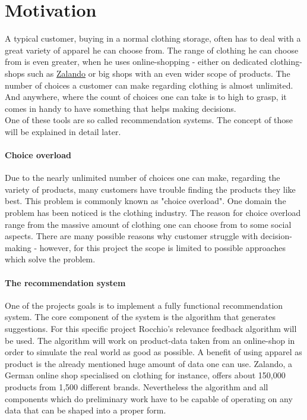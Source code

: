 

\section{Motivation}
A typical customer, buying in a normal clothing storage, often has to deal with a great variety of apparel he can choose from.
The range of clothing he can choose from is even greater, when he uses online-shopping - either on dedicated clothing-shops such as \href{https:\\www.zalando.de}{Zalando} or big shops with an even wider scope of products.
The number of choices a customer can make regarding clothing is almost unlimited.
And anywhere, where the count of choices one can take is to high to grasp, it comes in handy to have something that helps making decisions.\\
One of these tools are so called recommendation systems. The concept of those will be explained in detail later.


\paragraph{Choice overload}
Due to the nearly unlimited number of choices one can make, regarding the variety of products, many customers have trouble finding the products they like best.
This problem is commonly known as "choice overload".\citep[p. 454]{stanton:12}
One domain the problem has been noticed is the clothing industry.
The reason for choice overload range from the massive amount of clothing one can choose from to some social aspects.
There are many possible reasons why customer struggle with decision-making\citep[p. 454]{stanton:12} - however, for this project the scope is limited to possible approaches which solve the problem.


\paragraph{The recommendation system}
One of the projects goals is to implement a fully functional recommendation system.
The core component of the system is the algorithm that generates suggestions.
For this specific project Rocchio's relevance feedback algorithm will be used.
The algorithm will work on product-data taken from an online-shop in order to simulate the real world as good as possible.
A benefit of using apparel as product is the already mentioned huge amount of data one can use.
Zalando, a German online shop specialised on clothing for instance, offers about 150,000 products from 1,500 different brands.\citep{visser:14}
Nevertheless the algorithm and all components which do preliminary work have to be capable of operating on any data that can be shaped into a proper form.




